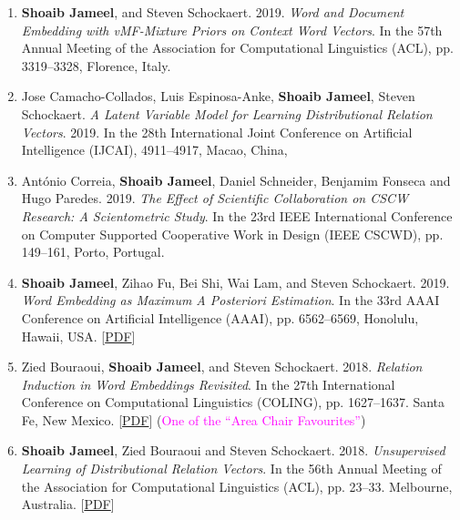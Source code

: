 \documentclass[margin]{res}
\begin{document}
\begin{resume}
\begin{enumerate}
\item \textbf{Shoaib Jameel}, and Steven Schockaert. 2019. \textit{Word and Document Embedding with vMF-Mixture Priors on Context Word Vectors}.  In the 57th Annual Meeting of the Association for Computational Linguistics (ACL), pp. 3319--3328, Florence, Italy. \newline

\item Jose Camacho-Collados, Luis Espinosa-Anke, \textbf{Shoaib Jameel}, Steven Schockaert. \textit{A Latent Variable Model for Learning Distributional Relation Vectors}. 2019. In the 28th International Joint Conference on Artificial Intelligence (IJCAI), 4911--4917, Macao, China, \newline

\item Ant\'onio Correia, \textbf{Shoaib Jameel}, Daniel Schneider, Benjamim Fonseca and Hugo Paredes. 2019. \textit{The Effect of Scientific Collaboration on CSCW Research: A Scientometric Study}. In the 23rd IEEE International Conference on Computer Supported Cooperative Work in Design (IEEE CSCWD), pp. 149--161, Porto, Portugal. \newline

\item \textbf{Shoaib Jameel}, Zihao Fu, Bei Shi, Wai Lam, and Steven Schockaert. 2019. \textit{Word Embedding as Maximum A Posteriori Estimation}. In the 33rd AAAI Conference on Artificial Intelligence (AAAI), pp. 6562--6569, Honolulu, Hawaii, USA. [\href{https://kar.kent.ac.uk/70009/7/AAAI-2019-Camera-Ready\%20\%281\%29.pdf}{PDF}] \newline

\item Zied Bouraoui, \textbf{Shoaib Jameel}, and Steven Schockaert. 2018. \textit{Relation Induction in Word Embeddings Revisited}. In the 27th International Conference on Computational Linguistics (COLING), pp. 1627--1637. Santa Fe, New Mexico. [\href{https://arxiv.org/abs/1708.06266}{PDF}] (\textcolor{magenta}{One of the ``Area Chair Favourites''}) \newline

\item \textbf{Shoaib Jameel}, Zied Bouraoui and Steven Schockaert. 2018. \textit{Unsupervised Learning of Distributional Relation Vectors}. In the 56th Annual Meeting of the Association for Computational Linguistics  (ACL), pp. 23--33. Melbourne, Australia. [\href{https://drive.google.com/open?id=1zwjJFiu6yaq-yq2as9liFkTagYlSl8x9}{PDF}] \newline


\end{enumerate}
\end{resume}
\end{document}
